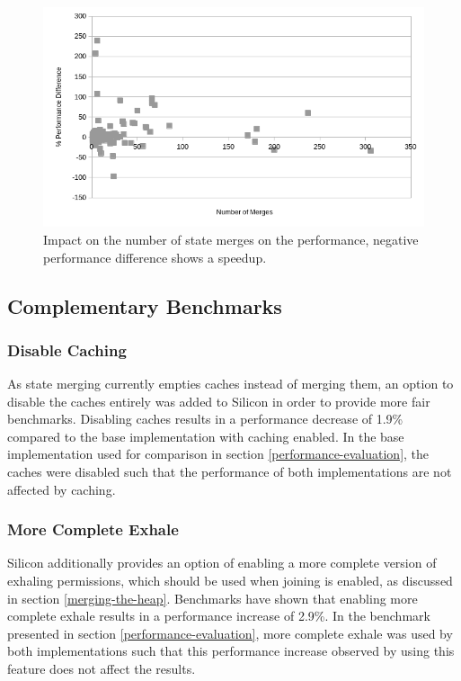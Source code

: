 \documentclass[11pt]{article}
\begin{document}
    \begin{figure}[H]
        \includegraphics[width=\linewidth]{state-merges-vs-performance.png}
        \caption{
            Impact on the number of state merges on the performance,
            negative performance difference shows a speedup.
        }
        \label{fig:state-merges}
    \end{figure}

    \subsection{Complementary Benchmarks}

    \subsubsection{Disable Caching} \label{disable-caching}

    As state merging currently empties caches instead of merging them, an
    option to disable the caches entirely was added to Silicon in order to
    provide more fair benchmarks.
    Disabling caches results in a performance decrease of 1.9\%
    compared to the base implementation with caching enabled. In the base implementation used
    for comparison in section \ref{performance-evaluation}, the caches were disabled
    such that the performance of both implementations are not affected by caching.

    \subsubsection{More Complete Exhale} \label{more-complete-exhale}

    Silicon additionally provides an option of enabling a more complete version
    of exhaling permissions, which should be used when joining is enabled,
    as discussed in section \ref{merging-the-heap}.
    Benchmarks have shown that enabling more complete 
    exhale results in a performance increase of 2.9\%. In the benchmark presented
    in section \ref{performance-evaluation}, more complete exhale was used
    by both implementations such that this performance increase observed by using this feature
    does not affect the results.
\end{document}
